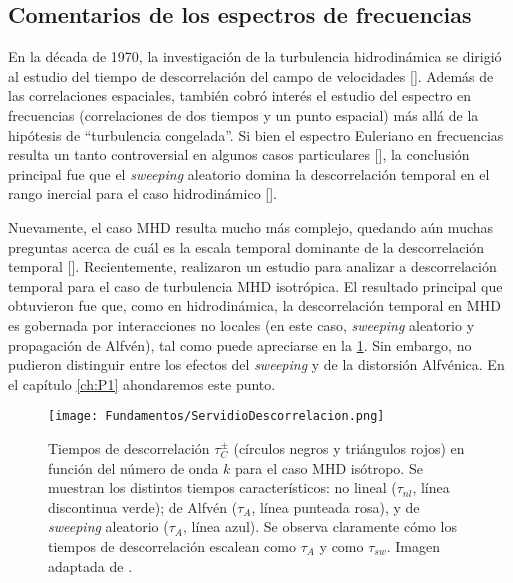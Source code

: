 


\subsection{Comentarios de los espectros de frecuencias}\label{sec2:SpectraFreq}

En la década de 1970, la investigación de la turbulencia hidrodinámica
se dirigió al estudio del tiempo de descorrelación del campo de
velocidades [\cite{tennekes_eulerian_1975, orszag_numerical_1972,
orszag_analytical_1970, comte-bellot_simple_1971}]. Además de las
correlaciones espaciales, también cobró interés el estudio del
espectro en frecuencias (correlaciones de dos tiempos y un punto
espacial) más allá de la hipótesis de ``turbulencia congelada''. Si
bien el espectro Euleriano en frecuencias resulta un tanto
controversial en algunos casos particulares [\cite{chen_sweeping_1989,
nelkin_time_1990}], la conclusión principal fue que el
\textit{sweeping} aleatorio domina la descorrelación temporal en el rango
inercial para el caso hidrodinámico
[\cite{zhou_non-gaussian_1993,sanada_random_1992}].

Nuevamente, el caso MHD resulta mucho más complejo, quedando aún
muchas preguntas acerca de cuál es la escala temporal dominante de la
descorrelación temporal [\cite{busse_2010_lagrangian}].
Recientemente, \cite{servidio_time_2011} realizaron un estudio para
analizar a descorrelación temporal para el caso de turbulencia MHD
isotrópica. El resultado principal que obtuvieron fue que, como en
hidrodinámica, la descorrelación temporal en MHD es gobernada por
interacciones no locales (en este caso, \emph{sweeping} aleatorio y
propagación de Alfv\'en), tal como puede apreciarse en
la \cref{fig2:ServidioDescorrelacion}. Sin embargo, no pudieron
distinguir entre los efectos del \emph{sweeping} y de la distorsión
Alfv\'enica. En el capítulo \ref{ch:P1} ahondaremos este punto.
\begin{figure}[h]
  \centering
  \texttt{[image: Fundamentos/ServidioDescorrelacion.png]}
  \caption{Tiempos de descorrelación $\tau_C^\pm$ (círculos negros y triángulos rojos) en función del número de onda $k$ para el caso MHD isótropo. Se muestran los distintos tiempos característicos: no lineal ($\tau_{nl}$, línea discontinua verde); de Alfv\'en ($\tau_{A}$, línea punteada rosa), y de \emph{sweeping} aleatorio ($\tau_{A}$, línea azul). Se observa claramente cómo los tiempos de descorrelación escalean como $\tau_{A}$ y como $\tau_{sw}$. Imagen adaptada de \cite{servidio_time_2011}.}
  \label{fig2:ServidioDescorrelacion}
\end{figure}






